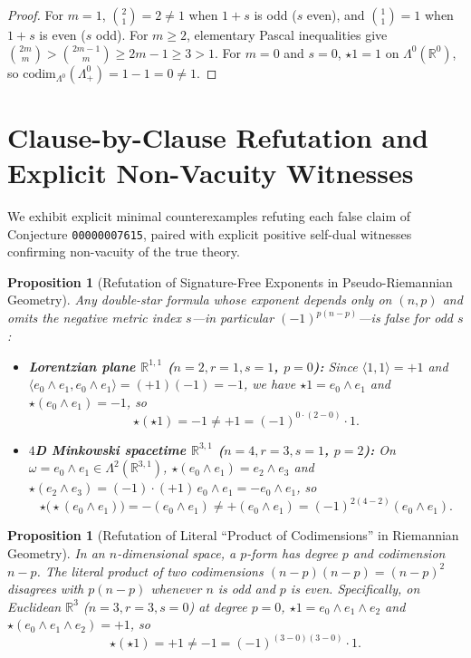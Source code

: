 \documentclass[11pt]{article}
\newtheorem{proposition}[theorem]{Proposition}
\theoremstyle{definition}
\newcommand{\R}{\mathbb{R}}
\newcommand{\codim}{\mathrm{codim}}
\begin{document}
\begin{proof}
For $m = 1$, $\binom{2}{1} = 2 \neq 1$ when $1 + s$ is odd ($s$ even), and $\binom{1}{1} = 1$ when $1 + s$ is even ($s$ odd). For $m \ge 2$, elementary Pascal inequalities give $\binom{2m}{m} > \binom{2m-1}{m} \ge 2m - 1 \ge 3 > 1$. For $m = 0$ and $s = 0$, $\star 1 = 1$ on $\Lambda^0(\R^0)$, so $\codim_{\Lambda^0}(\Lambda^0_+) = 1 - 1 = 0 \neq 1$.
\end{proof}

\section{Clause-by-Clause Refutation and Explicit Non-Vacuity Witnesses}

We exhibit explicit minimal counterexamples refuting each false claim of Conjecture \texttt{00000007615}, paired with explicit positive self-dual witnesses confirming non-vacuity of the true theory.

\begin{proposition}[Refutation of Signature-Free Exponents in Pseudo-Riemannian Geometry]\label{prop:refute-pseudo}
Any double-star formula whose exponent depends only on $(n, p)$ and omits the negative metric index $s$---in particular $(-1)^{p(n-p)}$---is false for odd $s$:
\begin{itemize}
  \item[(a)] \textbf{Lorentzian plane $\R^{1,1}$ ($n=2, r=1, s=1$, $p=0$):} Since $\langle 1, 1 \rangle = +1$ and $\langle e_0 \wedge e_1, e_0 \wedge e_1 \rangle = (+1)(-1) = -1$, we have $\star 1 = e_0 \wedge e_1$ and $\star(e_0 \wedge e_1) = -1$, so
  \[
    \star(\star 1) = -1 \neq +1 = (-1)^{0 \cdot (2 - 0)}\cdot 1.
  \]
  \item[(b)] \textbf{$4$D Minkowski spacetime $\R^{3,1}$ ($n=4, r=3, s=1$, $p=2$):} On $\omega = e_0 \wedge e_1 \in \Lambda^2(\R^{3,1})$, $\star(e_0 \wedge e_1) = e_2 \wedge e_3$ and $\star(e_2 \wedge e_3) = (-1)\cdot(+1)\,e_0 \wedge e_1 = -e_0 \wedge e_1$, so
  \[
    \star\bigl(\star(e_0 \wedge e_1)\bigr) = -(e_0 \wedge e_1) \neq +(e_0 \wedge e_1) = (-1)^{2(4-2)}(e_0 \wedge e_1).
  \]
\end{itemize}
\end{proposition}

\begin{proposition}[Refutation of Literal ``Product of Codimensions'' in Riemannian Geometry]\label{prop:refute-codim-sq}
In an $n$-dimensional space, a $p$-form has degree $p$ and codimension $n - p$. The literal product of two codimensions $(n - p)(n - p) = (n - p)^2$ disagrees with $p(n - p)$ whenever $n$ is odd and $p$ is even. Specifically, on Euclidean $\R^3$ ($n = 3, r = 3, s = 0$) at degree $p = 0$, $\star 1 = e_0 \wedge e_1 \wedge e_2$ and $\star(e_0 \wedge e_1 \wedge e_2) = +1$, so
\[
  \star(\star 1) = +1 \neq -1 = (-1)^{(3-0)(3-0)}\cdot 1.
\]
\end{proposition}
\end{document}
